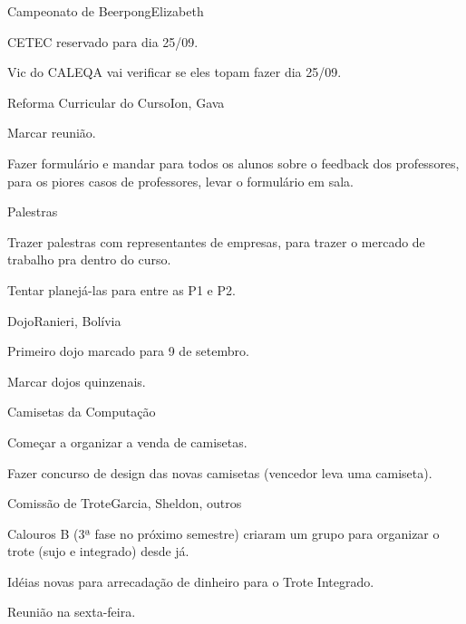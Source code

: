 \documentclass{article}
\date{26 de agosto de 2015}
\begin{document}
\begin{registro}{Campeonato de Beerpong}{Elizabeth}
\item CETEC reservado para dia 25/09.
\item Vic do CALEQA vai verificar se eles topam fazer dia 25/09.
\end{registro}

\begin{registro}{Reforma Curricular do Curso}{Ion, Gava}
\item Marcar reunião.
\item Fazer formulário e mandar para todos os alunos sobre o feedback dos professores, para os piores casos de professores, levar o formulário em sala.
\end{registro}

\begin{registro}{Palestras}{}
\item Trazer palestras com representantes de empresas, para trazer o mercado de trabalho pra dentro do curso.
\item Tentar planejá-las para entre as P1 e P2.
\end{registro}

\begin{registro}{Dojo}{Ranieri, Bolívia}
\item Primeiro dojo marcado para 9 de setembro.
\item Marcar dojos quinzenais.
\end{registro}

\begin{registro}{Camisetas da Computação}{}
\item Começar a organizar a venda de camisetas.
\item Fazer concurso de design das novas camisetas (vencedor leva uma camiseta).
\end{registro}

\begin{registro}{Comissão de Trote}{Garcia, Sheldon, outros}
\item Calouros B (3ª fase no próximo semestre) criaram um grupo para organizar o trote (sujo e integrado) desde já.
\item Idéias novas para arrecadação de dinheiro para o Trote Integrado.
\item Reunião na sexta-feira.
\end{registro}
\end{document}
